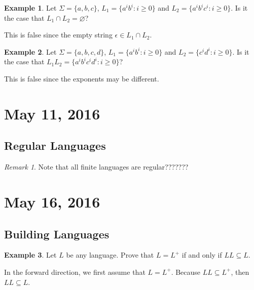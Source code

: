 \documentclass[11pt]{article}
\theoremstyle{plain} %
\theoremstyle{definition}
\theoremstyle{example}
\newtheorem*{example}{Example}
\theoremstyle{remark}
\newtheorem*{remark}{Remark}
\begin{document}
\begin{example}
Let $\Sigma = \{a,b,c\}$, $L_1 = \{a^ib^i : i \geq 0\}$ and $L_2 = \{a^ib^ic^i : i \geq 0\}$. Is it the case that $L_1 \cap L_2 = \varnothing$? 
\end{example}

This is false since the empty string $\epsilon \in L_1 \cap L_2$. 

\begin{example}
Let $\Sigma = \{a,b,c,d\}$, $L_1 = \{a^ib^i : i \geq 0\}$ and $L_2 = \{c^id^i : i \geq 0\}$. Is it the case that $L_1L_2 = \{a^ib^ic^id^i : i \geq 0\}$? 
\end{example}

This is false since the exponents may be different. 








\section{May 11, 2016}

\subsection{Regular Languages}
\begin{remark}
Note that all finite languages are regular???????
\end{remark}


















\section{May 16, 2016}
\subsection{Building Languages}

\begin{example}
Let $L$ be any language. Prove that $L = L^+$ if and only if $LL \subseteq L$.
\end{example}

In the forward direction, we first assume that $L = L^+$. Because $LL \subseteq L^+$, then $LL \subseteq L$.
\end{document}

